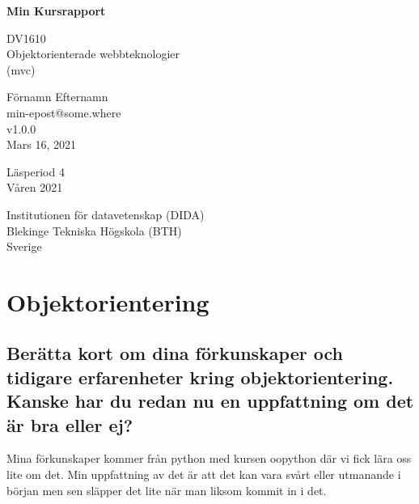 \documentclass[oneside]{book}
\begin{document}
\begin{titlepage}
    \begin{center}
        \vspace*{1cm}
 
        \Huge
        \textbf{Min Kursrapport}
 
        \vspace{0.5cm}
        \LARGE
        DV1610\\
        Objektorienterade webbteknologier\\
        (mvc)
 
        \vspace{0.5cm}
        \LARGE
        Förnamn Efternamn\\
        min-epost@some.where\\

        \vspace{0.5cm}
        \LARGE
        v1.0.0\\
        Mars 16, 2021
 
        \vfill
 
        \vspace{2cm}
        \Large
        Läsperiod 4\\
        Våren 2021

        \vspace{0.5cm}
        \Large
        Institutionen för datavetenskap (DIDA)\\
        Blekinge Tekniska Högskola (BTH)\\
        Sverige
 
    \end{center}
\end{titlepage}

\tableofcontents



\chapter{Objektorientering}

\section{Berätta kort om dina förkunskaper och tidigare erfarenheter kring objektorientering. Kanske har du redan nu en uppfattning om det är bra eller ej?}

Mina förkunskaper kommer från python med kursen oopython där vi fick lära oss lite om det. Min uppfattning av det är att det kan vara svårt eller utmanande i början men 
sen släpper det lite när man liksom kommit in i det.
\end{document}
